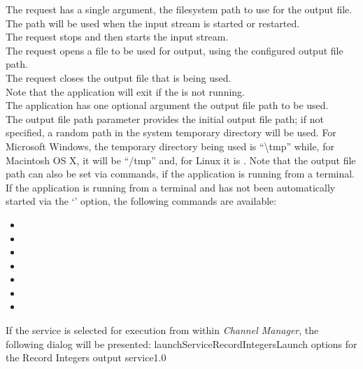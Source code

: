 The  request has a single argument,
the file\longDash{}system path to use for the output file.
The path will be used when the input stream is started or restarted.\\

The  request stops and then
starts the input stream.\\

The  request opens a file to be
used for output, using the configured output file path.\\

The  request closes the output
file that is being used.\\

Note that the application will exit if the
 is not running.\\

The application has one optional argument \longDash{} the output file path to be used.
\insertAppParameters
{}
\insertOutputServiceComment\\

The output file path parameter provides the initial output file path; if not specified, a
random path in the system temporary directory will be used.
For Microsoft Windows, the temporary directory being used is ``\textbackslash{}tmp''
while, for Macintosh OS X, it will be ``/tmp'' and, for Linux it is \TBD.
Note that the output file path can also be set via commands, if the application is
running from a terminal.\\

If the application is running from a terminal and has not been automatically started via
the `' option, the following commands are available:
\begin{itemize}
\item{}
\item\exSp{}
\item\exSp{}
\item\exSp{}
\item\exSp{}
\item\exSp{}
\item\exSp{}
\end{itemize}
\condPage
If the service is selected for execution from within \emph{Channel Manager}, the following
dialog will be presented:
%
{launchServiceRecordIntegers}{Launch options for the Record Integers output service}{1.0}

